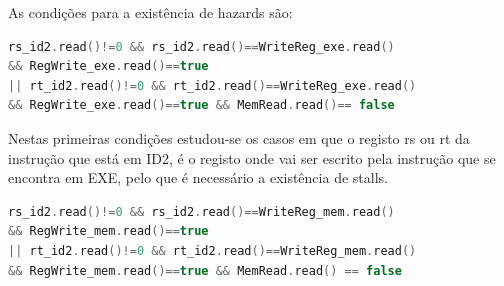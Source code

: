 \documentclass[pdftex,12pt,a4paper]{report}
\begin{document}
As condições para a existência de hazards são:


\begin{lstlisting}[language=c]
rs_id2.read()!=0 && rs_id2.read()==WriteReg_exe.read() 
&& RegWrite_exe.read()==true 
|| rt_id2.read()!=0 && rt_id2.read()==WriteReg_exe.read() 
&& RegWrite_exe.read()==true && MemRead.read()== false
\end{lstlisting} 

\begin{table}[!htb]
\centering
\label{my-label}
\end{table}

Nestas primeiras condições estudou-se os casos em que o registo rs ou rt da instrução que está em ID2, é o registo onde vai ser escrito pela instrução que se encontra em EXE, pelo que é necessário a existência de stalls. 

\begin{lstlisting}[language=c]
rs_id2.read()!=0 && rs_id2.read()==WriteReg_mem.read() 
&& RegWrite_mem.read()==true
|| rt_id2.read()!=0 && rt_id2.read()==WriteReg_mem.read() 
&& RegWrite_mem.read()==true && MemRead.read() == false
\end{lstlisting}

\begin{table}[!htb]
\centering
\label{my-label}
\end{table}
\end{document}
